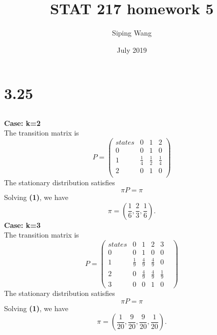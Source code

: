 \documentclass{article}
\title{STAT 217 homework 5}
\author{Siping Wang}
\date{July 2019}
\begin{document}
\maketitle

\section{3.25}
\subsection{}
\textbf{Case: k=2}\\
The transition matrix is
\begin{equation*}
    P=
    \begin{pmatrix}
    states&0&1&2\\
    0&0&1&0\\
    1&\frac{1}{4}&\frac{1}{2}&\frac{1}{4}\\
    2&0&1&0\\
    \end{pmatrix}
\end{equation*}
The stationary distribution satisfies
\begin{equation}
    \pi P = \pi
\end{equation}
Solving \textbf{(1)}, we have
\begin{equation*}
    \pi = (\frac{1}{6}, \frac{2}{3}, \frac{1}{6}).
\end{equation*}
\textbf{Case: k=3}\\
The transition matrix is
\begin{equation*}
    P=
    \begin{pmatrix}
    states&0&1&2&3\\
    0&0&1&0&0\\
    1&\frac{1}{9}&\frac{4}{9}&\frac{4}{9}&0\\
    2&0&\frac{4}{9}&\frac{4}{9}&\frac{1}{9}\\
    3&0&0&1&0&
    \end{pmatrix}
\end{equation*}
The stationary distribution satisfies
\begin{equation}
    \pi P = \pi
\end{equation}
Solving \textbf{(1)}, we have
\begin{equation*}
    \pi = (\frac{1}{20}, \frac{9}{20}, \frac{9}{20}, \frac{1}{20}).
\end{equation*}
\end{document}
